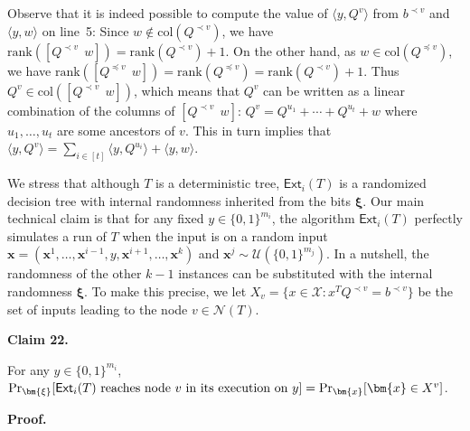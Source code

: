 Observe that it is indeed possible to compute the value of $\langle y,Q^{v}\rangle$ from $b^{\prec v}$ and $\langle y,w\rangle$ on line 5: Since $w\notin\mathrm{col}(Q^{\prec v})$, we have $\mathrm{rank}([Q^{\prec v}\>\>w])=\mathrm{rank}(Q^{\prec v})+1$.
On the other hand, as $w\in\mathrm{col}(Q^{\preceq v})$, we have $\mathrm{rank}([Q^{\preceq v}\>\>w])=\mathrm{rank}(Q^{\preceq v})=\mathrm{rank}(Q^{\prec v})+1$. Thus $Q^{v}\in\mathrm{col}([Q^{\prec v}\>\>w])$, which means that $Q^{v}$ can be written as a linear combination of the columns of $[Q^{\prec v}\>\>w]$: $Q^{v}=Q^{u_{1}}+\cdots+Q^{u_{t}}+w$ where $u_{1},\ldots,u_{t}$ are some ancestors of $v$. This in turn implies that $\langle y,Q^{v}\rangle=\sum_{i\in[t]}\langle y,Q^{u_{i}}\rangle+\langle y,w\rangle$.\par




We stress that although $T$ is a deterministic tree, $\mathsf{Ext}_{i}\mathopen{}\left(T\mathclose{}\right)$ is a randomized decision tree with internal randomness inherited from the bits $\bm{\xi}$. Our main technical claim is that for any fixed $y\in\{0,1\}^{m_{i}}$, the algorithm $\mathsf{Ext}_{i}\mathopen{}\left(T\mathclose{}\right)$ perfectly simulates a run of $T$ when the input is on a random input $\bm{x}=(\bm{x}^{1},\ldots,\bm{x}^{i-1},y,\bm{x}^{i+1},\ldots,\bm{x}^{k})$ and $\bm{x}^{j}\sim\mathcal{U}(\{0,1\}^{m_{j}})$. In a nutshell, the randomness of the other $k-1$ instances can be substituted with the internal randomness $\bm{\xi}$. To make this precise, we let $X_{v}=\{x\in\mathcal{X}:x^{T}Q^{\prec v}=b^{\prec v}\}$ be the set of inputs leading to the node $v\in\mathcal{N}(T)$.\par





\par\medskip\noindent\textbf{
Claim 22. 
}\par



For any $y\in\{0,1\}^{m_{i}}$, $\Pr_{\bm{\xi}}[\textup{$\mathsf{Ext}_{i}\mathopen{}\left(T\mathclose{}\right)$ reaches node $v$ in its execution on $y$}]=\Pr_{\bm{x}}[\bm{x}\in X^{v}]$.\par






\par\medskip\noindent\textbf{
\textbf{Proof}.}\par





